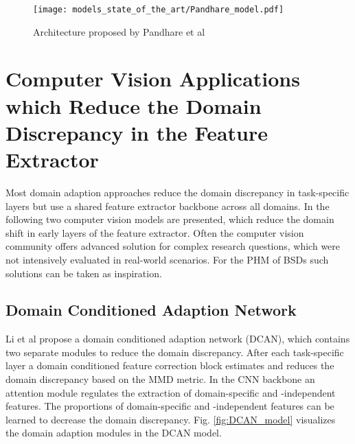 \begin{figure}[H]
  \centering
  \texttt{[image: models\_state\_of\_the\_art/Pandhare\_model.pdf]}
  \caption{Architecture proposed by Pandhare et al \cite{Pandhare2021}}
  \label{fig:Pandhare_model}
\end{figure}

\section{Computer Vision Applications which Reduce the Domain Discrepancy in the Feature Extractor}
Most domain adaption approaches reduce the domain discrepancy in task-specific layers but use a shared feature extractor backbone across all domains. In the following two computer vision models are presented, which reduce the domain shift in early layers of the feature extractor. Often the computer vision community offers advanced solution for complex research questions, which were not intensively evaluated in real-world scenarios. For the PHM of BSDs such solutions can be taken as inspiration.

\subsection{Domain Conditioned Adaption Network}
Li et al \cite{li2020} propose a domain conditioned adaption network (DCAN), which contains two separate modules to reduce the domain discrepancy. After each task-specific layer a domain conditioned feature correction block estimates and reduces the domain discrepancy based on the MMD metric. In the CNN backbone an attention module regulates the extraction of domain-specific and -independent features. The proportions of domain-specific and -independent features can be learned to decrease the domain discrepancy. Fig. \ref{fig:DCAN_model} visualizes the domain adaption modules in the DCAN model.

